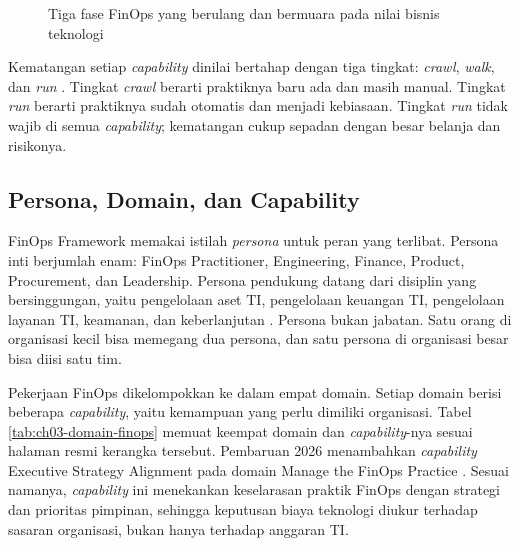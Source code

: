 \begin{figure}[!htb]
  \centering
  
  \caption{Tiga fase FinOps yang berulang dan bermuara pada nilai bisnis
           teknologi}
  \label{fig:ch03-siklus-finops}
\end{figure}

Kematangan setiap \textit{capability} dinilai bertahap dengan tiga tingkat: \textit{crawl},
\textit{walk}, dan \textit{run} \cite{finops2026}. Tingkat \textit{crawl} berarti praktiknya baru
ada dan masih manual. Tingkat \textit{run} berarti praktiknya sudah otomatis dan menjadi kebiasaan.
Tingkat \textit{run} tidak wajib di semua \textit{capability}; kematangan cukup sepadan dengan besar
belanja dan risikonya.

\subsection{Persona, Domain, dan Capability}

FinOps Framework memakai istilah \textit{persona} untuk peran yang terlibat. Persona inti berjumlah
enam: FinOps Practitioner, Engineering, Finance, Product, Procurement, dan Leadership. Persona
pendukung datang dari disiplin yang bersinggungan, yaitu pengelolaan aset TI, pengelolaan keuangan
TI, pengelolaan layanan TI, keamanan, dan keberlanjutan \cite{finops2026}. Persona bukan jabatan.
Satu orang di organisasi kecil bisa memegang dua persona, dan satu persona di organisasi besar bisa
diisi satu tim.

Pekerjaan FinOps dikelompokkan ke dalam empat domain. Setiap domain berisi beberapa
\textit{capability}, yaitu kemampuan yang perlu dimiliki organisasi. Tabel
\ref{tab:ch03-domain-finops} memuat keempat domain dan \textit{capability}-nya sesuai halaman resmi
kerangka tersebut. Pembaruan 2026 menambahkan \textit{capability} Executive Strategy Alignment pada
domain Manage the FinOps Practice \cite{finops2026}. Sesuai namanya, \textit{capability} ini
menekankan keselarasan praktik FinOps dengan strategi dan prioritas pimpinan, sehingga keputusan
biaya teknologi diukur terhadap sasaran organisasi, bukan hanya terhadap anggaran TI.

